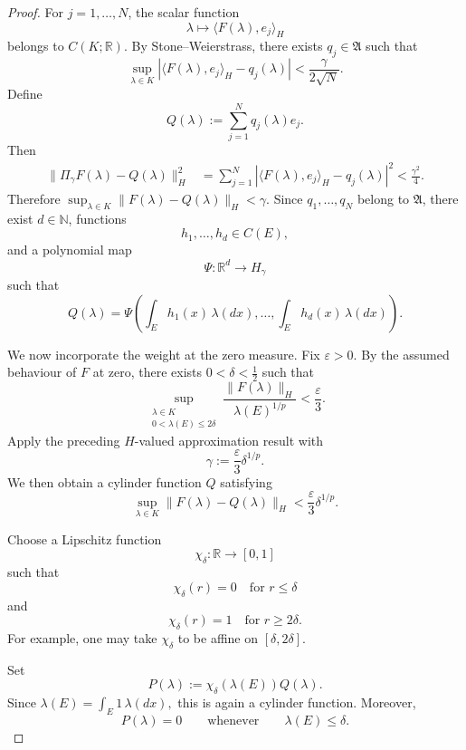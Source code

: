 \documentclass[a4paper,10pt]{article}
\begin{document}
\begin{proof}
For \(j=1,\ldots,N\), the scalar function
\[
        \lambda
        \longmapsto
        \bigl\langle F(\lambda),e_j\bigr\rangle_H
\]
belongs to \(C(K;\mathbb R)\). By Stone--Weierstrass, there exists
\(q_j\in\mathfrak A\) such that
\[
        \sup_{\lambda\in K}
        \left|
        \bigl\langle F(\lambda),e_j\bigr\rangle_H
        -
        q_j(\lambda)
        \right|
        <
        \frac{\gamma}{2\sqrt{N}}.
\]
Define
\[
        Q(\lambda)
        :=
        \sum_{j=1}^N q_j(\lambda)e_j.
\]
Then
\[
\begin{aligned}
\lVert \Pi_\gamma F(\lambda)-Q(\lambda)\rVert_H^2
&=
\sum_{j=1}^N
\left|
\bigl\langle F(\lambda),e_j\bigr\rangle_H
-
q_j(\lambda)
\right|^2
<
\frac{\gamma^2}{4}.
\end{aligned}
\]
Therefore
$
        \sup_{\lambda\in K}
        \lVert F(\lambda)-Q(\lambda)\rVert_H
        <
        \gamma.
$ Since \(q_1,\ldots,q_N\) belong to \(\mathfrak A\), there exist
\(d\in\mathbb N\), functions
\[
        h_1,\ldots,h_d\in C(E),
\]
and a polynomial map
\[
        \Psi:\mathbb R^d\longrightarrow H_\gamma
\]
such that
\[
        Q(\lambda)
        =
        \Psi
        \left(
        \int_Eh_1(x)\,\lambda(dx),
        \ldots,
        \int_Eh_d(x)\,\lambda(dx)
        \right).
\]

We now incorporate the weight at the zero measure. Fix
\(\varepsilon>0\). By the assumed behaviour of \(F\) at zero, there
exists
$
        0<\delta<\frac12
$
such that
\[
\sup_{\substack{\lambda\in K\\
                 0<\lambda(E)\le2\delta}}
\frac{\lVert F(\lambda)\rVert_H}
     {\lambda(E)^{1/p}}
<
\frac{\varepsilon}{3}.
\]
Apply the preceding \(H\)-valued approximation result with
\[
        \gamma
        :=
        \frac{\varepsilon}{3}\delta^{1/p}.
\]
We then obtain a cylinder function \(Q\) satisfying
\[
        \sup_{\lambda\in K}
        \lVert F(\lambda)-Q(\lambda)\rVert_H
        <
        \frac{\varepsilon}{3}\delta^{1/p}.
\]

Choose a Lipschitz function
\[
        \chi_\delta:\mathbb R\longrightarrow[0,1]
\]
such that
\[
        \chi_\delta(r)=0
        \quad\text{for }r\le\delta
\]
and
\[
        \chi_\delta(r)=1
        \quad\text{for }r\ge2\delta.
\]
For example, one may take \(\chi_\delta\) to be affine on
\([\delta,2\delta]\).

Set
\[
        P(\lambda)
        :=
        \chi_\delta(\lambda(E))Q(\lambda).
\]
Since
$
        \lambda(E)=\int_E1\,\lambda(dx),
$
this is again a cylinder function. Moreover,
\[
        P(\lambda)=0
        \qquad\text{whenever}\qquad
        \lambda(E)\le\delta.
\]


\end{proof}
\end{document}
